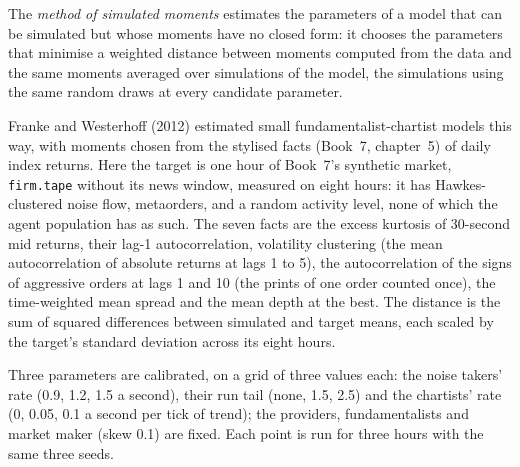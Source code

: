 \begin{definition}\label{def:mx:build-an-agent-based-market:msm}
The \emph{method of simulated moments} estimates the parameters of a model that can be simulated but whose moments
have no closed form: it chooses the parameters that minimise a weighted distance between moments computed from the data and the same moments averaged
over simulations of the model, the simulations using the same random draws at every candidate parameter.
\end{definition}

Franke and Westerhoff (2012) estimated small fundamentalist-chartist models this way, with moments chosen from the stylised facts (Book~7, chapter~5)
of daily index returns. Here the target is one hour of Book~7's synthetic market, \texttt{firm.tape} without its news window, measured on eight hours:
it has Hawkes-clustered noise flow, metaorders,  and a random activity level, none of which the agent population has as such. The
seven facts are the excess kurtosis of 30-second mid returns, their lag-1 autocorrelation, volatility clustering (the mean autocorrelation of absolute
returns at lags 1 to 5), the autocorrelation of the signs of aggressive orders at lags 1 and 10 (the prints of one order counted once), the
time-weighted mean spread and the mean depth at the best. The distance is the sum of squared differences between simulated and target means, each
scaled by the target's standard deviation across its eight hours.

\label{lst:mx:build-an-agent-based-market:msm}

Three parameters are calibrated, on a grid of three values each: the noise takers' rate (0.9, 1.2, 1.5 a second), their run tail (none, 1.5, 2.5) and
the chartists' rate (0, 0.05, 0.1 a second per tick of trend); the providers, fundamentalists and market maker (skew 0.1) are fixed. Each point is run
for three hours with the same three seeds.

